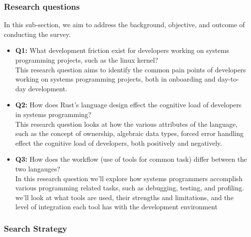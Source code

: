 \documentclass[conference]{IEEEtran}
\begin{document}
\subsubsection{Research questions}
\label{research_questions}

In this sub-section, we aim to address the background, objective, and outcome of conducting the survey.
\begin{itemize}
    \item \textbf{Q1:} {What development friction exist for developers working on systems programming projects, such as the linux kernel}?\\
          {This research question aims to identify the common pain points of developers working on systems programming projects, both in onboarding and day-to-day development.
          }
    \item \textbf{Q2:} {How does Rust's language design effect the cognitive load of developers in systems programming}?\\
          {This research question looks at how the various attributes of the language, such as the concept of ownership, algebraic data types, forced error handling effect
          the cognitive load of developers, both positively and negatively.}
    \item \textbf{Q3:} {How does the workflow (use of tools for common task) differ between the two langauges}?\\
          {In this research question we'll explore how systems programmers accomplish various programming related tasks, such as debugging, testing, and profiling.
          we'll look at what tools are used, their strengths and limitations, and the level of integration each tool has with the development environment}
\end{itemize}

\subsubsection{Search Strategy}
\end{document}
